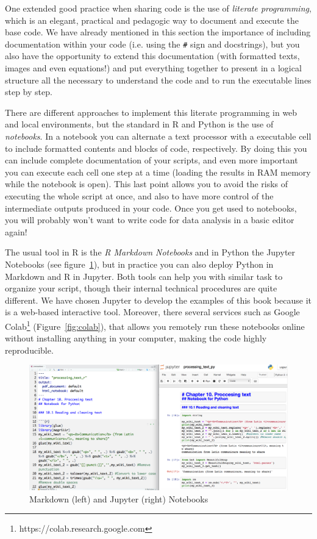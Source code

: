 One extended good practice when sharing code is the use of \textit{literate programming}, which is an elegant, practical and pedagogic way to document and execute the base code. We have already mentioned in this section the importance of including documentation within your code (i.e. using the \texttt{\#} sign and docstrings), but you also have the opportunity to extend this documentation (with formatted texts, images and even equations!) and put everything together to present in a logical structure all the necessary to understand the code and to run the executable lines step by step. 

There are different approaches to implement this literate programming in web and local environments, but the standard in R and Python is the use of \textit{notebooks}. In a notebook you can alternate a text processor with a executable cell to include formatted contents and blocks of code, respectively. By doing this you can include complete documentation of your scripts, and even more important you can execute each cell one step at a time (loading the results in RAM memory while the notebook is open). This last point allows you to avoid the risks of executing the whole script at once, and also to have more control of the intermediate outputs produced in your code. Once you get used to notebooks, you will probably won't want to write code for data analysis in a basic editor again!

The usual tool in R is the \textit{R Markdown Notebooks} and in Python the Jupyter Notebooks (see figure~\ref{fig:notebooks}), but in practice you can also deploy Python in Markdown and R in Jupyter. Both tools can help you with similar task to organize your script, though their internal technical procedures are quite different. We have chosen Jupyter to develop the examples of this book because it is a web-based interactive tool. Moreover, there several services such as Google Colab\footnote{https://colab.research.google.com} (Figure~\ref{fig:colab}), that allows you remotely run these notebooks online without installing anything in your computer, making the code highly reproducible.

\begin{figure}
\centering
\includegraphics[width=0.9\linewidth]{figures/ch04_notebooks}
\caption{Markdown (left) and Jupyter (right) Notebooks}
\label{fig:notebooks}
\end{figure}

